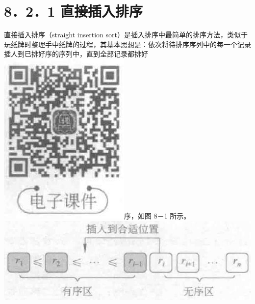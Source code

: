 \documentclass[10pt]{article}
\begin{document}
\section*{8．2．1 直接插入排序}
直接插入排序（straight insertion sort）是插入排序中最简单的排序方法，类似于玩纸牌时整理手中纸牌的过程，其基本思想是：依次将待排序序列中的每一个记录插人到已排好序的序列中，直到全部记录都排好\\
\includegraphics[max width=\textwidth]{2025_06_06_704745ea57b15b2333e5g-271(1)}序，如图 8－1 所示。\\
\includegraphics[max width=\textwidth, center]{2025_06_06_704745ea57b15b2333e5g-271}
\end{document}
